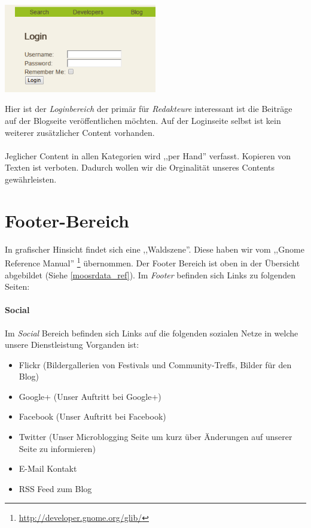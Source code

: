 \begin{center}
\includegraphics[width=0.5\textwidth]{../screenshots/login.png}
\end{center}

Hier ist der \emph{Loginbereich} der primär für \emph{Redakteure} interessant
ist die Beiträge auf der Blogseite veröffentlichen möchten. Auf der Loginseite
selbst ist kein weiterer zusätzlicher Content vorhanden.
\\
\\
Jeglicher Content in allen Kategorien wird ,,per Hand'' verfasst. Kopieren von
Texten ist verboten. Dadurch wollen wir die Orginalität unseres Contents
gewährleisten.

\section{Footer-Bereich}
In grafischer Hinsicht findet sich eine ,,Waldszene''. Diese haben wir vom 
,,Gnome Reference Manual'' \footnote{\url{http://developer.gnome.org/glib/}} übernommen.
Der Footer Bereich ist oben in der Übersicht abgebildet (Siehe
\ref{moosrdata_ref}).
Im \emph{Footer} befinden sich Links zu folgenden Seiten:

\paragraph{Social}
Im \emph{Social} Bereich befinden sich Links auf die folgenden sozialen Netze in
welche unsere Dienstleistung Vorganden ist:
\begin{itemize}
\item Flickr (Bildergallerien von Festivals und Community-Treffs, Bilder für den
    Blog)
\item Google+ (Unser Auftritt bei Google+)
\item Facebook (Unser Auftritt bei Facebook)
\item Twitter (Unser Microblogging Seite um kurz über Änderungen auf unserer
Seite zu informieren)
\item E-Mail Kontakt
\item RSS Feed zum Blog
\end{itemize}


